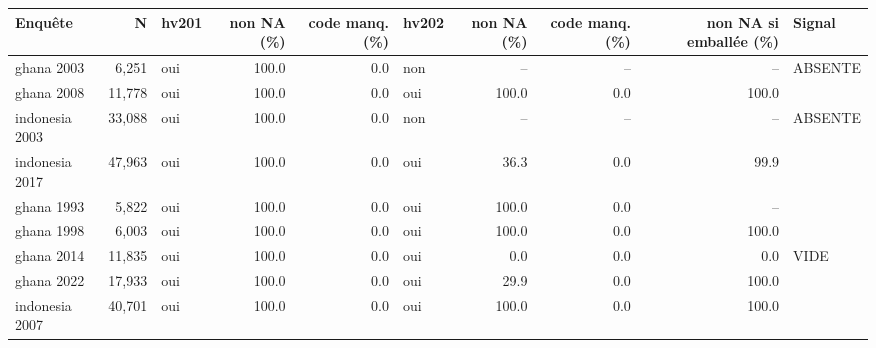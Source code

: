\begin{tabular}{lrlrrlrrrl}
\toprule
Enqu\^ete & N & hv201 & non NA (\%) & code manq. (\%) & hv202 & non NA (\%) & code manq. (\%) & non NA si emball\'ee (\%) & Signal \\
\midrule
ghana 2003 &  6,251 & oui & 100.0 & 0.0 & non & -- & -- & -- & ABSENTE \\
ghana 2008 & 11,778 & oui & 100.0 & 0.0 & oui & 100.0 & 0.0 & 100.0 &  \\
indonesia 2003 & 33,088 & oui & 100.0 & 0.0 & non & -- & -- & -- & ABSENTE \\
indonesia 2017 & 47,963 & oui & 100.0 & 0.0 & oui & 36.3 & 0.0 & 99.9 &  \\
ghana 1993 &  5,822 & oui & 100.0 & 0.0 & oui & 100.0 & 0.0 & -- &  \\
ghana 1998 &  6,003 & oui & 100.0 & 0.0 & oui & 100.0 & 0.0 & 100.0 &  \\
ghana 2014 & 11,835 & oui & 100.0 & 0.0 & oui & 0.0 & 0.0 & 0.0 & VIDE \\
ghana 2022 & 17,933 & oui & 100.0 & 0.0 & oui & 29.9 & 0.0 & 100.0 &  \\
indonesia 2007 & 40,701 & oui & 100.0 & 0.0 & oui & 100.0 & 0.0 & 100.0 &  \\
\bottomrule
\end{tabular}
